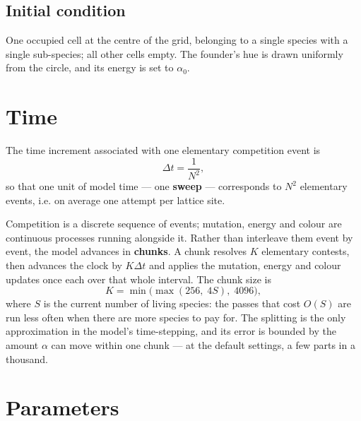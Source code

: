 \documentclass[11pt,a4paper]{article}
\newcommand{\dt}{\Delta t}
\begin{document}
\subsection{Initial condition}

One occupied cell at the centre of the grid, belonging to a single species with a single
sub-species; all other cells empty. The founder's hue is drawn uniformly from the circle,
and its energy is set to $\alpha_0$.

\section{Time}
\label{sec:time}

The time increment associated with one elementary competition event is
\begin{equation}
  \dt = \frac{1}{N^2},
  \label{eq:dt}
\end{equation}
so that one unit of model time --- one \textbf{sweep} --- corresponds to $N^2$ elementary
events, i.e. on average one attempt per lattice site.

Competition is a discrete sequence of events; mutation, energy and colour are continuous
processes running alongside it. Rather than interleave them event by event, the model
advances in \textbf{chunks}. A chunk resolves $K$ elementary contests, then advances the
clock by $K\dt$ and applies the mutation, energy and colour updates once each over that
whole interval. The chunk size is
\begin{equation}
  K = \min\bigl(\max(256,\; 4 S),\; 4096\bigr),
\end{equation}
where $S$ is the current number of living species: the passes that cost $O(S)$ are run
less often when there are more species to pay for. The splitting is the only
approximation in the model's time-stepping, and its error is bounded by the amount
$\alpha$ can move within one chunk --- at the default settings, a few parts in a
thousand.

\section{Parameters}
\end{document}
